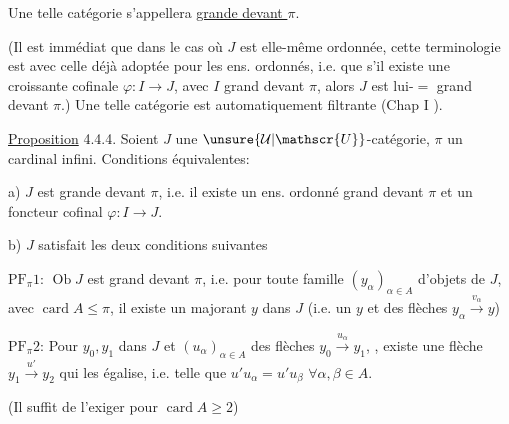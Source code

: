 
Une telle catégorie s'appellera \uline{grande devant $\pi$}.

(Il est immédiat que dans le cas où $J$ est elle-même ordonnée, cette terminologie est  avec celle déjà adoptée pour les ens. ordonnés, i.e. que s'il existe une  croissante cofinale $\varphi:I\longrightarrow J$, avec $I$ grand devant $\pi$, alors $J$ est lui-$=$ grand devant $\pi$.) Une telle catégorie est automatiquement filtrante (Chap I ).

\uline{Proposition} 4.4.4. Soient $J$ une $\unsure{\mathcal{U}|\mathscr{U}}$-catégorie,  $\pi$ un cardinal infini. Conditions équivalentes:

a) $J$ est grande devant $\pi$, i.e. il existe un ens. ordonné grand devant $\pi$ et un foncteur cofinal $\varphi:I\longrightarrow J$.

b) $J$ satisfait les deux conditions suivantes

$\mathrm{PF}_{\pi}1$: $\operatorname{Ob}J$ est grand devant $\pi$, i.e. pour toute famille $(y_{\alpha})_{\alpha\in A}$ d'objets de $J$, avec $\operatorname{card}A\leq\pi$, il existe un majorant $y$ dans $J$ (i.e. un $y$ et des flèches $y_{\alpha}\xrightarrow{v_{\alpha}}y$)

$\mathrm{PF}_{\pi}2$: Pour $y_0,y_1$ dans $J$ et    $(u_{\alpha})_{\alpha\in A}$ des flèches $y_0\xrightarrow{u_{\alpha}}y_1$, , existe une flèche $y_1\xrightarrow{u'}y_2$ qui les égalise, i.e. telle que $u'u_{\alpha}=u'u_{\beta}$ $\forall\alpha,\beta\in A$.

(Il suffit de l'exiger pour $\operatorname{card}A\geq2$)


